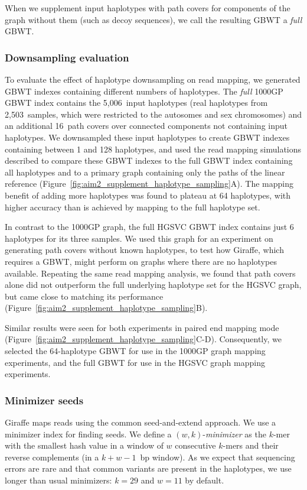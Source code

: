 \documentclass[11pt]{ucscthesis}
\newcommand{\vocab}[1]{\emph{#1}}
\begin{document}
When we supplement input haplotypes with path covers for components of the graph without them (such as decoy sequences), we call the resulting GBWT a \vocab{full} GBWT.

\subsubsection{Downsampling evaluation}
\label{subsec:aim2:downsamplingeval}

To evaluate the effect of haplotype downsampling on read mapping, we generated GBWT indexes containing different numbers of haplotypes.
The \vocab{full} 1000GP GBWT index contains the 5,006~input haplotypes (real haplotypes from 2,503~samples, which were restricted to the autosomes and sex chromosomes) and an additional 16~path covers over connected components not containing input haplotypes.
We downsampled these input haplotypes to create GBWT indexes containing between 1 and 128 haplotypes, and used the read mapping simulations described to compare these GBWT indexes to the full GBWT index containing all haplotypes and to a primary graph containing only the paths of the linear reference (Figure~\ref{fig:aim2_supplement_haplotype_sampling}A).
The mapping benefit of adding more haplotypes was found to plateau at 64 haplotypes, with higher accuracy than is achieved by mapping to the full haplotype set.

In contrast to the 1000GP graph, the full HGSVC GBWT index contains just 6 haplotypes for its three samples. We used this graph for an experiment on generating path covers without known haplotypes, to test how Giraffe, which requires a GBWT, might perform on graphs where there are no haplotypes available. Repeating the same read mapping analysis, we found that path covers alone did not outperform the full underlying haplotype set for the HGSVC graph, but came close to matching its performance (Figure~\ref{fig:aim2_supplement_haplotype_sampling}B).

Similar results were seen for both experiments in paired end mapping mode (Figure~\ref{fig:aim2_supplement_haplotype_sampling}C-D). Consequently, we selected the 64-haplotype GBWT for use in the 1000GP graph mapping experiments, and the full GBWT for use in the HGSVC graph mapping experiments.


\subsubsection{Minimizer seeds}
\label{subsec:aim2:minimizers}
Giraffe maps reads using the common seed-and-extend approach.
We use a minimizer index\cite{Roberts2004} for finding seeds.
We define a $(w,k)$-\vocab{minimizer} as the $k$-mer with the smallest hash value in a window of $w$ consecutive $k$-mers and their reverse complements (in a $k+w-1$~bp window).
As we expect that sequencing errors are rare and that common variants are present in the haplotypes, we use longer than usual minimizers: $k = 29$ and $w = 11$ by default.
\end{document}
